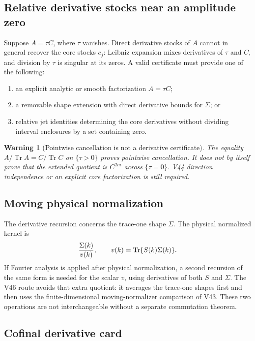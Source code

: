 \documentclass[11pt]{article}
\newtheorem{warning}[theorem]{Warning}
\theoremstyle{remark}
\begin{document}
\subsection{Relative derivative stocks near an amplitude zero}

Suppose \(A=\tau C\), where \(\tau\) vanishes.  Direct derivative
stocks of \(A\) cannot in general recover the core stocks \(c_j\):
Leibniz expansion mixes derivatives of \(\tau\) and \(C\), and
division by \(\tau\) is singular at its zeros.  A valid certificate
must provide one of the following:
\begin{enumerate}
\item an explicit analytic or smooth factorization \(A=\tau C\);
\item a removable shape extension with direct derivative bounds for
\(\Sigma\); or
\item relative jet identities determining the core derivatives
without dividing interval enclosures by a set containing zero.
\end{enumerate}

\begin{warning}[Pointwise cancellation is not a derivative
certificate]
\label{warn:v12v49-pointwise}
The equality
\(A/\operatorname{Tr}A=C/\operatorname{Tr}C\) on
\(\{\tau>0\}\) proves pointwise cancellation.  It does not by itself
prove that the extended quotient is \(C^{2m}\) across
\(\{\tau=0\}\).  V44 direction independence or an explicit core
factorization is still required.
\end{warning}

\subsection{Moving physical normalization}

The derivative recursion concerns the trace-one shape \(\Sigma\).
The physical normalized kernel is
\[
 {\Sigma(k)\over v(k)},\qquad
 v(k)=\operatorname{Tr}\{S(k)\Sigma(k)\}.
\]
If Fourier analysis is applied after physical normalization, a
second recursion of the same form is needed for the scalar \(v\),
using derivatives of both \(S\) and \(\Sigma\).  The V46 route avoids
that extra quotient: it averages the trace-one shapes first and then
uses the finite-dimensional moving-normalizer comparison of V43.
These two operations are not interchangeable without a separate
commutation theorem.

\subsection{Cofinal derivative card}
\end{document}
